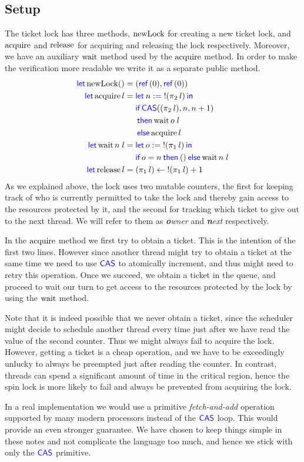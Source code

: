 \subsection{Setup}
The ticket lock has three methods, $\operatorname{newLock}$ for creating a new ticket lock, and $\operatorname{acquire}$ and $\operatorname{release}$
for acquiring and releasing the lock respectively.
Moreover, we have an auxiliary $\operatorname{wait}$ method used by the $\operatorname{acquire}$ method.
In order to make the verification more readable we write it as a separate public method.
\begin{align*}
  \langkw{let} \newLock () ={} &(\Ref(0), \Ref(0))\\
  \langkw{let} \acquire l ={} &\Let n = \deref (\Proj{2} l) in\\
                           &\If{\CAS( (\Proj{2} l), n , n + 1) }\\
                           &then{\wait o \; l}\\
                           &\Else{\acquire l}\\
  \langkw{let} \wait n \; l ={} &\Let o = \deref (\Proj{1} l) in \\
                           &\If{o = n}then{()}\Else{\wait n\; l}\\
  \langkw{let} \release l ={} &(\Proj{1} l) \gets \deref (\Proj{1} l) + 1
\end{align*}
As we explained above, the lock uses two mutable counters, the first for keeping track of who is currently permitted to take the lock and thereby gain access to the resources protected by it, and the second for tracking which ticket to give out to the next thread.
We will refer to them as \emph{\textbf{o}wner} and \emph{\textbf{n}ext} respectively.

In the $\operatorname{acquire}$ method we first try to obtain a ticket.
This is the intention of the first two lines.
However since another thread might try to obtain a ticket at the same time we need to use $\textsf{\color{blue} CAS}$ to atomically increment, and thus might need to retry this operation.
Once we succeed, we obtain a ticket in the queue, and proceed to wait our turn to get access to the resources protected by the lock by using the $\operatorname{wait}$ method.
\begin{remark}
  Note that it is indeed possible that we never obtain a ticket, since the scheduler might decide to schedule another thread every time just after we have read the value of the second counter.
  Thus we might always fail to acquire the lock.
  However, getting a ticket is a cheap operation, and we have to be exceedingly unlucky to always be preempted just after reading the counter.
  In contrast, threads can spend a significant amount of time in the critical region, hence the spin lock is more likely to fail and always be prevented from acquiring the lock.

  In a real implementation we would use a primitive \emph{fetch-and-add} operation supported by many modern processors instead of the $\textsf{\color{blue} CAS}$ loop.
  This would provide an even stronger guarantee.
  We have chosen to keep things simple in these notes and not complicate the language too much, and hence we stick with only the $\textsf{\color{blue} CAS}$ primitive.
\end{remark}

